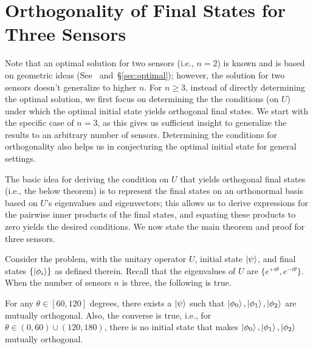 \section{Orthogonality of Final States for Three Sensors}
\label{sec:three-ortho}

Note that an optimal solution for two sensors (i.e., $n=2$) is known and is based on geometric ideas (See~\cite{Hillery_2023} and~\S\ref{sec:optimal}); however,
the solution for two sensors doesn't generalize to higher $n$.
For $n \geq 3$, instead of directly determining the optimal solution, we first focus on determining the
the conditions (on $U$) under which the optimal initial state yields orthogonal final states. 
We start with the specific case of $n=3$,
as this gives us sufficient insight to generalize the results to 
an arbitrary number of sensors. 
Determining the conditions for orthogonality also helps us in conjecturing the optimal initial state for general settings. 

The basic idea for deriving the condition on $U$ that yields orthogonal final states (i.e., the below theorem) is to represent the final states on an orthonormal basis based on $U$'s eigenvalues and eigenvectors; this allows us to derive expressions for the pairwise inner products of the final states, and equating these products to zero yields the desired conditions. We now state the main theorem and proof for three sensors.

\begin{thm-prf}
Consider the \iso problem, with the unitary operator $U$, initial state $\ket{\psi}$,
and final states $\{\ket{\phi_i}\}$ as defined therein. Recall that the eigenvalues of
$U$ are $\{e^{+i\theta}, e^{-i\theta}\}$. When the number of sensors $n$ is three, the following is true.

For any $\theta \in [60, 120]$ degrees, there exists a $\ket{\psi}$ such that $\ket{\phi_0}, \ket{\phi_1}, \ket{\phi_2}$ are mutually orthogonal.
Also, the converse is true, i.e., for $\theta \in (0, 60) \cup (120, 180)$, there is
no initial state that makes $\ket{\phi_0}, \ket{\phi_1}, \ket{\phi_2}$ mutually orthogonal.
\label{thm:3sensor}
\end{thm-prf}

